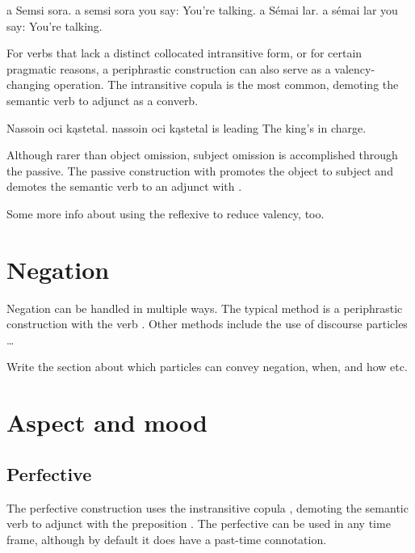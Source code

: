 \begin{subexamples}
	\ex
		\script a Semsi sora.
		\bits a semsi sora
		\gloss you say: 
		\tr You're talking.
	\ex \label{ex:fake_intransitive}
		\script a Sémai lar.
		\bits a sémai lar
		\gloss you say: 
		\tr You're talking. 
\end{subexamples} 

For verbs that lack a distinct collocated intransitive form, or for certain pragmatic reasons, a periphrastic construction can also serve as a valency-changing operation. The intransitive copula  is the most common, demoting the semantic verb to adjunct as a converb.

\begin{example}
	\script Nassoin oci kąstetal.
	\bits nassoin oci kąstetal
	 is leading
	\tr The king's in charge.
\end{example}

Although rarer than object omission, subject omission is accomplished through the  passive. The passive construction with  promotes the object to subject and demotes the semantic verb to an adjunct with .

\begin{kaobox}[frametitle=\sc todo:]
	Some more info about using the reflexive to reduce valency, too.
\end{kaobox}

\section{Negation}
Negation can be handled in multiple ways. The typical method is a periphrastic construction with the verb . Other methods include the use of discourse particles \dots

\begin{kaobox}[frametitle=\sc todo:]
	Write the section about which particles can convey negation, when, and how etc.
\end{kaobox}

\section{Aspect and mood}
\subsection{Perfective}
The perfective construction uses the instransitive copula , demoting the semantic verb to adjunct with the preposition . The perfective can be used in any time frame, although by default it does have a past-time connotation.

